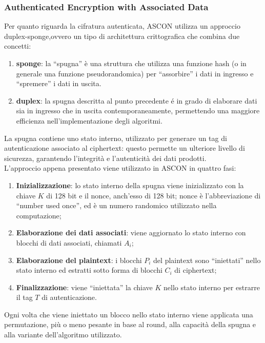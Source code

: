 \subsubsection{Authenticated Encryption with Associated Data}

Per quanto riguarda la cifratura autenticata, ASCON utilizza un approccio duplex-sponge\cite{ascon-specification},ovvero un tipo di architettura crittografica che combina due concetti:
\begin{enumerate}[label=\Roman*.]
    \item \textbf{sponge}: la ``spugna'' è una struttura che utilizza una funzione hash (o in generale una funzione pseudorandomica) per ``assorbire'' i dati in ingresso e ``spremere'' i dati in uscita.
    \item \textbf{duplex}: la spugna descritta al punto precedente é in grado di elaborare dati sia in ingresso che in uscita contemporaneamente, permettendo una maggiore efficienza nell'implementazione degli algoritmi.
\end{enumerate}
La spugna contiene uno stato interno, utilizzato per generare un tag di autenticazione associato al ciphertext: questo permette un ulteriore livello di sicurezza, garantendo l'integrità e l'autenticità dei dati prodotti. \\

\noindent L'approccio appena presentato viene utilizzato in ASCON in quattro fasi\cite{ascon-specification}:
\begin{enumerate}
    \item \textbf{Inizializzazione}: lo stato interno della spugna viene inizializzato con la chiave $K$ di 128 bit e il nonce, anch'esso di 128 bit; nonce è l'abbreviazione di ``number used once'', ed è un numero randomico utilizzato nella computazione;
    \item \textbf{Elaborazione dei dati associati}: viene aggiornato lo stato interno con blocchi di dati associati, chiamati $A_i$;
    \item \textbf{Elaborazione del plaintext}: i blocchi $P_i$ del plaintext sono ``iniettati'' nello stato interno ed estratti sotto forma di blocchi $C_i$ di ciphertext;
    \item \textbf{Finalizzazione}: viene ``iniettata'' la chiave $K$ nello stato interno per estrarre il tag $T$ di autenticazione.
\end{enumerate}
Ogni volta che viene iniettato un blocco nello stato interno viene applicata una permutazione, più o meno pesante in base al round, alla capacità della spugna e alla variante dell'algoritmo utilizzato. \\

